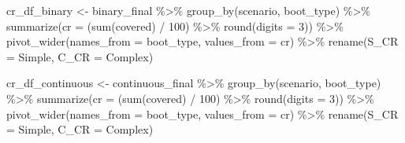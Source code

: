 \documentclass[
]{article}
\newenvironment{Shaded}{\begin{snugshade}}{\end{snugshade}}
\newcommand{\AttributeTok}[1]{\textcolor[rgb]{0.77,0.63,0.00}{#1}}
\newcommand{\DecValTok}[1]{\textcolor[rgb]{0.00,0.00,0.81}{#1}}
\newcommand{\FunctionTok}[1]{\textcolor[rgb]{0.00,0.00,0.00}{#1}}
\newcommand{\NormalTok}[1]{#1}
\newcommand{\OtherTok}[1]{\textcolor[rgb]{0.56,0.35,0.01}{#1}}
\newcommand{\SpecialCharTok}[1]{\textcolor[rgb]{0.00,0.00,0.00}{#1}}
\begin{document}
\begin{Shaded}
\begin{Highlighting}[]
\NormalTok{cr\_df\_binary }\OtherTok{\textless{}{-}}
\NormalTok{  binary\_final }\SpecialCharTok{\%\textgreater{}\%}
  \FunctionTok{group\_by}\NormalTok{(scenario, boot\_type) }\SpecialCharTok{\%\textgreater{}\%}
  \FunctionTok{summarize}\NormalTok{(}\AttributeTok{cr =}\NormalTok{ (}\FunctionTok{sum}\NormalTok{(covered) }\SpecialCharTok{/} \DecValTok{100}\NormalTok{) }\SpecialCharTok{\%\textgreater{}\%} \FunctionTok{round}\NormalTok{(}\AttributeTok{digits =} \DecValTok{3}\NormalTok{)) }\SpecialCharTok{\%\textgreater{}\%}
  \FunctionTok{pivot\_wider}\NormalTok{(}\AttributeTok{names\_from =}\NormalTok{ boot\_type, }\AttributeTok{values\_from =}\NormalTok{ cr) }\SpecialCharTok{\%\textgreater{}\%} 
  \FunctionTok{rename}\NormalTok{(}\AttributeTok{S\_CR =}\NormalTok{ Simple, }\AttributeTok{C\_CR =}\NormalTok{ Complex)}

\NormalTok{cr\_df\_continuous }\OtherTok{\textless{}{-}}
\NormalTok{  continuous\_final }\SpecialCharTok{\%\textgreater{}\%}
  \FunctionTok{group\_by}\NormalTok{(scenario, boot\_type) }\SpecialCharTok{\%\textgreater{}\%}
  \FunctionTok{summarize}\NormalTok{(}\AttributeTok{cr =}\NormalTok{ (}\FunctionTok{sum}\NormalTok{(covered) }\SpecialCharTok{/} \DecValTok{100}\NormalTok{) }\SpecialCharTok{\%\textgreater{}\%} \FunctionTok{round}\NormalTok{(}\AttributeTok{digits =} \DecValTok{3}\NormalTok{)) }\SpecialCharTok{\%\textgreater{}\%}
  \FunctionTok{pivot\_wider}\NormalTok{(}\AttributeTok{names\_from =}\NormalTok{ boot\_type, }\AttributeTok{values\_from =}\NormalTok{ cr) }\SpecialCharTok{\%\textgreater{}\%} 
  \FunctionTok{rename}\NormalTok{(}\AttributeTok{S\_CR =}\NormalTok{ Simple, }\AttributeTok{C\_CR =}\NormalTok{ Complex)}
\end{Highlighting}
\end{Shaded}
\end{document}
